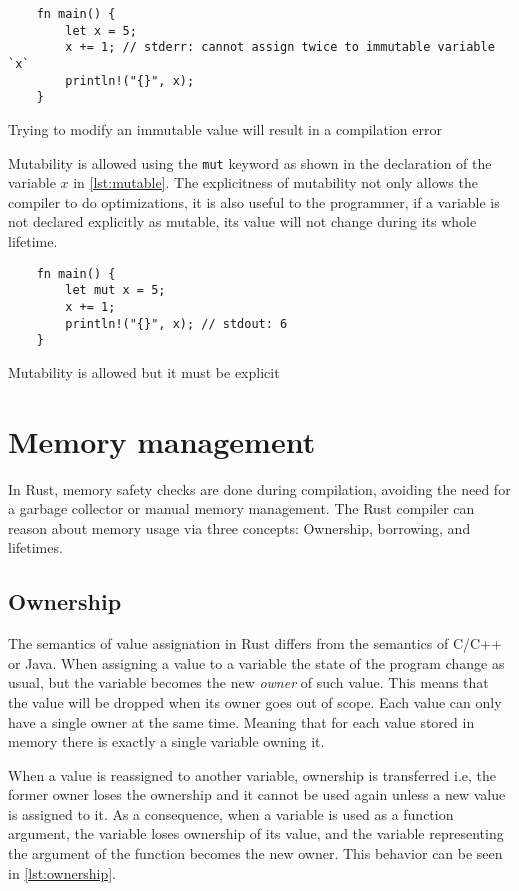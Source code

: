 \begin{listing}[ht]
	\begin{verbatim}
    fn main() {
        let x = 5;
        x += 1; // stderr: cannot assign twice to immutable variable `x`
        println!("{}", x);
    }
	\end{verbatim}
  \caption{Trying to modify an immutable value will result in a compilation error}
  \label{lst:immutable}
\end{listing}

Mutability is allowed using the \texttt{mut} keyword as shown in the declaration
of the variable $x$ in \ref{lst:mutable}. The explicitness of mutability not
only allows the compiler to do optimizations, it is also useful to the
programmer, if a variable is not declared explicitly as mutable, its value will
not change during its whole lifetime.

\begin{listing}[ht]
	\begin{verbatim}
    fn main() {
        let mut x = 5;
        x += 1;
        println!("{}", x); // stdout: 6 
    }
	\end{verbatim}
  \caption{Mutability is allowed but it must be explicit}
  \label{lst:mutable}
\end{listing}

\section{Memory management}
In Rust, memory safety checks are done during compilation, avoiding the need for
a garbage collector or manual memory management. The Rust compiler can reason
about memory usage via three concepts: Ownership, borrowing, and lifetimes.

\subsection{Ownership}
The semantics of value assignation in Rust differs from the semantics of C/C++
or Java. When assigning a value to a variable the state of the program change as
usual, but the variable becomes the new \textit{owner} of such value.
\cite{ownership_types} This means that the value will be dropped when its owner
goes out of scope. Each value can only have a single owner at the same time.
Meaning that for each value stored in memory there is exactly a single variable
owning it. 

When a value is reassigned to another variable, ownership is transferred i.e,
the former owner loses the ownership and it cannot be used again unless a new
value is assigned to it. As a consequence, when a variable is used as a function
argument, the variable loses ownership of its value, and the variable
representing the argument of the function becomes the new owner. This behavior
can be seen in \ref{lst:ownership}.

